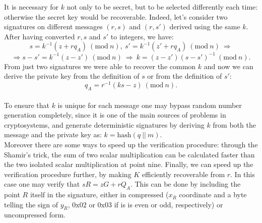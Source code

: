 \bigskip
\noindent
It is necessary for $k$ not only to be secret, but to be selected differently each time: otherwise the secret key would be recoverable. Indeed, let's consider two signatures on different messages $(r, s)$ and $(r, s')$ derived using the same $k$. After having converted $r, s$ and $s'$ to integers, we have:
$$s = k^{-1}(z + rq_A) \ (\text{mod} \ n), \ s' = k^{-1}(z' + rq_A) \ (\text{mod} \ n) \ \Longrightarrow $$ $$\Longrightarrow s - s' = k^{-1}(z - z') \ (\text{mod} \ n) \ \Longrightarrow \ k = (z - z')(s - s')^{-1} \ (\text{mod} \ n).$$
From just two signatures we were able to recover the common $k$ and now we can derive the private key from the definition of $s$ or from the definition of $s'$:
$$q_A = r^{-1}(ks - z) \ (\text{mod} \ n).$$
\\
To ensure that $k$ is unique for each message one may bypass random number generation completely, since it is one of the main sources of problems in cryptosystems, and generate deterministic signatures by deriving $k$ from both the message and the private key as: $k = \text{hash}(q \ || \ m)$.
\\
Moreover there are some ways to speed up the verification procedure: through the Shamir’s trick, the sum of two scalar multiplication can be calculated faster than the two isolated scalar multiplication at point nine. Finally, we can speed up the verification procedure further, by making $K$ efficiently recoverable from $r$. In this case one may verify that $sR = zG + rQ_A$. This can be done by including the point $R$ itself in the signature, either in compressed ($x_R$ coordinate and a byte telling the sign of $y_R$, $0\text{x}02$ or $0\text{x}03$ if is is even or odd, respectively) or uncompressed form.

